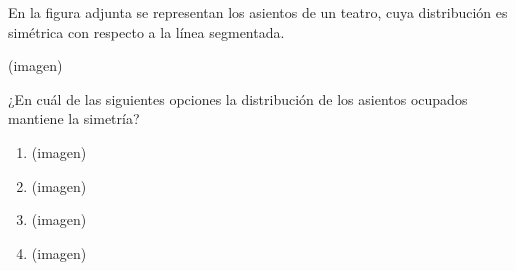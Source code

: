 \begin{problem}
    En la figura adjunta se representan los asientos de un teatro, cuya distribución es simétrica con respecto a la línea segmentada.

    \begin{center}
    (imagen)
    \end{center}

    ¿En cuál de las siguientes opciones la distribución de los asientos ocupados mantiene la simetría?

    \begin{enumerate}[label=\Alph*.]
        \item (imagen)
        \item (imagen)
        \item (imagen)
        \item (imagen)
    \end{enumerate}
\end{problem}
